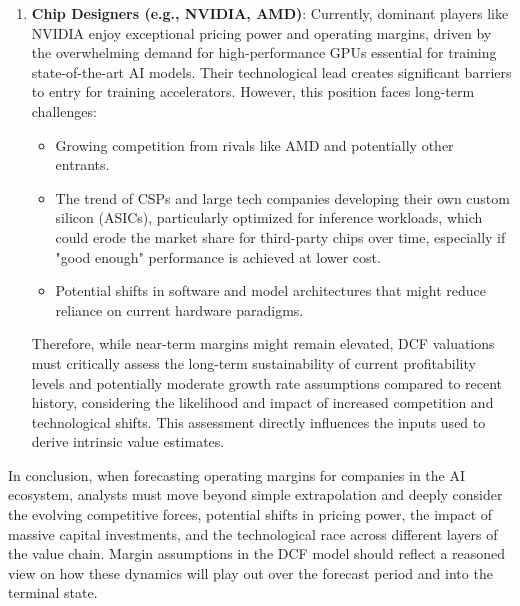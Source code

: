 \begin{enumerate}
          This dynamic might lead to further market share concentration among the top providers (AWS, GCP, Azure). A pivotal strategy for sustaining or improving margins will likely involve adding higher-level services and abstractions (e.g., managed AI platforms, integrated development frameworks like AWS Amplify or Firebase, managed databases, CDNs) on top of bare-metal compute, attracting and retaining customers through value-added offerings rather than just infrastructure pricing.
    \item \textbf{Chip Designers (e.g., NVIDIA, AMD)}: Currently, dominant players like NVIDIA enjoy exceptional pricing power and operating margins, driven by the overwhelming demand for high-performance GPUs essential for training state-of-the-art AI models. Their technological lead creates significant barriers to entry for training accelerators. However, this position faces long-term challenges:
          \begin{itemize}
              \item Growing competition from rivals like AMD and potentially other entrants.
              \item The trend of CSPs and large tech companies developing their own custom silicon (ASICs), particularly optimized for inference workloads, which could erode the market share for third-party chips over time, especially if "good enough" performance is achieved at lower cost.
              \item Potential shifts in software and model architectures that might reduce reliance on current hardware paradigms.
          \end{itemize}
          Therefore, while near-term margins might remain elevated, DCF valuations must critically assess the long-term sustainability of current profitability levels and potentially moderate growth rate assumptions compared to recent history, considering the likelihood and impact of increased competition and technological shifts. This assessment directly influences the inputs used to derive intrinsic value estimates.
\end{enumerate}

In conclusion, when forecasting operating margins for companies in the AI ecosystem, analysts must move beyond simple extrapolation and deeply consider the evolving competitive forces, potential shifts in pricing power, the impact of massive capital investments, and the technological race across different layers of the value chain. Margin assumptions in the DCF model should reflect a reasoned view on how these dynamics will play out over the forecast period and into the terminal state.

